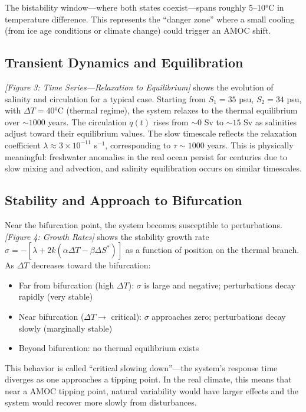 \documentclass[12pt,letterpaper]{article}
\begin{document}
The bistability window---where both states coexist---spans roughly 5--10°C in temperature difference. This represents the ``danger zone'' where a small cooling (from ice age conditions or climate change) could trigger an AMOC shift.

\subsection{Transient Dynamics and Equilibration}

\textit{[Figure 3: Time Series---Relaxation to Equilibrium]} shows the evolution of salinity and circulation for a typical case. Starting from $S_1 = 35$ psu, $S_2 = 34$ psu, with $\Delta T = 40$°C (thermal regime), the system relaxes to the thermal equilibrium over $\sim 1000$ years. The circulation $q(t)$ rises from $\sim 0$ Sv to $\sim 15$ Sv as salinities adjust toward their equilibrium values. The slow timescale reflects the relaxation coefficient $\lambda \approx 3 \times 10^{-11}$ s$^{-1}$, corresponding to $\tau \sim 1000$ years. This is physically meaningful: freshwater anomalies in the real ocean persist for centuries due to slow mixing and advection, and salinity equilibration occurs on similar timescales.

\subsection{Stability and Approach to Bifurcation}

Near the bifurcation point, the system becomes susceptible to perturbations. \textit{[Figure 4: Growth Rates]} shows the stability growth rate $\sigma = -[\lambda + 2k(\alpha \Delta T - \beta \Delta S^*)]$ as a function of position on the thermal branch. As $\Delta T$ decreases toward the bifurcation:

\begin{itemize}
\item Far from bifurcation (high $\Delta T$): $\sigma$ is large and negative; perturbations decay rapidly (very stable)
\item Near bifurcation ($\Delta T \to$ critical): $\sigma$ approaches zero; perturbations decay slowly (marginally stable)
\item Beyond bifurcation: no thermal equilibrium exists
\end{itemize}

This behavior is called ``critical slowing down''---the system's response time diverges as one approaches a tipping point. In the real climate, this means that near a AMOC tipping point, natural variability would have larger effects and the system would recover more slowly from disturbances.
\end{document}
